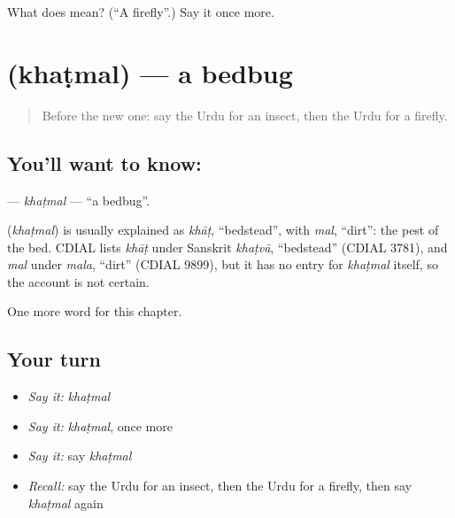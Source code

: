 \begin{tcolorbox}[breakable,colback=teal!4,colframe=teal!35!black,title={Before you move on}]
What does  mean? (\textquotedblleft{}A firefly\textquotedblright{}.) Say it once more.
\end{tcolorbox}
\section[\texorpdfstring{\ur{کھٹمل} (khaṭmal)}{کھٹمل (khaṭmal)}]{ (khaṭmal) — a bedbug}

\label{lesson:UR-C235-khatmal}



\begin{quote}
Before the new one: say the Urdu for an insect, then the Urdu for a firefly.
\end{quote}

\subsection*{You'll want to know: }
\textbf{} — \emph{khaṭmal} — \textquotedblleft{}a bedbug\textquotedblright{}.

\begin{cousinweb}
\textbf{} (\emph{khaṭmal}) is usually explained as \emph{khāṭ}, \textquotedblleft{}bedstead\textquotedblright{}, with \emph{mal}, \textquotedblleft{}dirt\textquotedblright{}: the pest of the bed. CDIAL lists \emph{khāṭ} under Sanskrit \emph{khaṭvā}, \textquotedblleft{}bedstead\textquotedblright{} (CDIAL 3781), and \emph{mal} under \emph{mala}, \textquotedblleft{}dirt\textquotedblright{} (CDIAL 9899), but it has no entry for \emph{khaṭmal} itself, so the account is not certain.
\end{cousinweb}

\begin{grammarlens}[title={What you've built}]
One more word for this chapter.
\end{grammarlens}

\subsection*{Your turn}
\begin{itemize}
\raggedright
  \item \emph{Say it:} \emph{khaṭmal}
  \item \emph{Say it:} \emph{khaṭmal}, once more
  \item \emph{Say it:} say \emph{khaṭmal}
  \item \emph{Recall:} say the Urdu for an insect, then the Urdu for a firefly, then say \emph{khaṭmal} again
\end{itemize}

